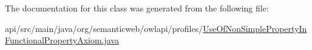 The documentation for this class was generated from the following file\-:\begin{DoxyCompactItemize}
\item 
api/src/main/java/org/semanticweb/owlapi/profiles/\hyperlink{_use_of_non_simple_property_in_functional_property_axiom_8java}{Use\-Of\-Non\-Simple\-Property\-In\-Functional\-Property\-Axiom.\-java}\end{DoxyCompactItemize}
